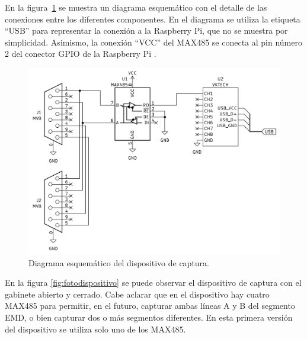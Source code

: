En la figura~\ref{fig:esquematico} se muestra un diagrama esquemático con el detalle de las conexiones entre los diferentes componentes. En el diagrama se utiliza la etiqueta ``USB'' para representar la conexión a la Raspberry Pi, que no se muestra por simplicidad. Asimismo, la conexión ``VCC'' del MAX485 se conecta al pin número 2 del conector GPIO de la Raspberry Pi \cite{gpio}.

\begin{figure}[htbp]
	\centering
	\includegraphics[width=1\textwidth]{./Figures/esquematico.png}
	\caption{Diagrama esquemático del dispositivo de captura.}
    \label{fig:esquematico}
\end{figure}

En la figura \ref{fig:fotodispositivo} se puede observar el dispositivo de captura con el gabinete abierto y cerrado. Cabe aclarar que en el dispositivo hay cuatro MAX485 para permitir, en el futuro, capturar ambas líneas A y B del segmento EMD, o bien capturar dos o más segmentos diferentes. En esta primera versión del dispositivo se utiliza solo uno de los MAX485.

